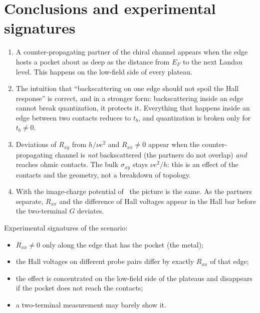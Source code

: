 \documentclass[11pt,a4paper]{article}
\newcommand{\tb}{t_b}
\newcommand{\Rxy}{R_{xy}}
\newcommand{\Rxx}{R_{xx}}
\newcommand{\EF}{E_F}
\begin{document}
\section{Conclusions and experimental signatures}

\begin{enumerate}
\item A counter-propagating partner of the chiral channel appears when the
  edge hosts a pocket about as deep as the distance from $\EF$ to the next
  Landau level. This happens on the low-field side of every plateau.
\item The intuition that ``backscattering on one edge should not spoil the
  Hall response'' is correct, and in a stronger form: backscattering inside
  an edge cannot break quantization, it protects it. Everything that happens
  inside an edge between two contacts reduces to $\tb$, and quantization is
  broken only for $\tb\neq0$.
\item Deviations of $\Rxy$ from $h/\nu e^2$ and $\Rxx\neq0$ appear when the
  counter-propagating channel is \emph{not} backscattered (the partners do
  not overlap) \emph{and} reaches ohmic contacts. The bulk $\sigma_{xy}$
  stays $\nu e^2/h$: this is an effect of the contacts and the geometry, not
  a breakdown of topology.
\item With the image-charge potential of~\cite{andolina} the picture is the
  same. As the partners separate, $\Rxx$ and the difference of Hall voltages
  appear in the Hall bar before the two-terminal $G$ deviates.
\end{enumerate}
Experimental signatures of the scenario:
\begin{itemize}
\item $\Rxx\neq0$ only along the edge that has the pocket (the metal);
\item the Hall voltages on different probe pairs differ by exactly $\Rxx$
  of that edge;
\item the effect is concentrated on the low-field side of the plateaus and
  disappears if the pocket does not reach the contacts;
\item a two-terminal measurement may barely show it.
\end{itemize}

\end{document}

